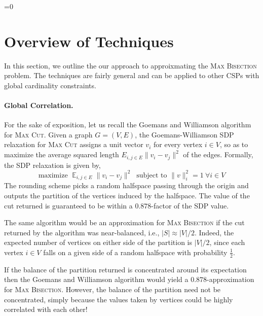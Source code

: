 \documentclass[11pt]{article}
\def\full{1}
\theoremstyle{definition}
\newcommand{\norm}[1]{\lVert#1\rVert}
\newcommand{\Esymb}{\mathbb{E}}
\DeclareMathOperator*{\E}{\Esymb}
\newcommand{\problemmacro}[1]{\texorpdfstring{\textsc{#1}}{#1}\xspace}
\newcommand{\maxcut}{\problemmacro{Max Cut}}
\newcommand{\maxbisection}{\problemmacro{Max Bisection}}
\numberwithin{equation}{section}
\let\origparagraph\paragraph
\renewcommand{\paragraph}[1]{\origparagraph{#1.}}
\begin{document}
\ifnum\full=0 \vspace{-8pt}\fi

\section{Overview of Techniques} \label{sec:overview}

In this section, we outline the our approach to approixmating the
\maxbisection problem.  The techniques are fairly general and can be applied to other CSPs with global cardinality constraints.


\paragraph{Global Correlation}
For the sake of exposition, let us recall the Goemans and Williamson algorithm
for \maxcut.
Given a graph $G = (V,E)$, the Goemans-Williamson SDP relaxation for
\maxcut assigns a unit vector $v_i$ for every vertex $i \in V$, so as to maximize the average squared length $E_{i,j \in E} \norm{v_i - v_j}^2$ of the edges.  Formally, the SDP relaxation is given by,
$$ \textrm{maximize }    \E_{i,j \in E} \norm{v_i - v_j}^2  \ \textrm{ subject to } \norm{v}_i^2 = 1 ~\forall i \in V$$
The rounding scheme picks a random halfspace passing through the
origin and outputs the partition of the vertices induced by the
halfspace.  The value of the cut returned is guaranteed to be within a
$0.878$-factor of the SDP value.

The same algorithm would be an approximation for \maxbisection if the
cut returned by the algorithm was near-balanced, i.e., $|S| \approx
|V|/2$.  Indeed, the expected number of vertices on either side of the
partition is $|V|/2$, since each vertex $i \in V$ falls on a given
side of a random halfspace with probability $\frac{1}{2}$.

If the balance of the partition returned is concentrated around its
expectation then the Goemans and Williamson algorithm would yield a
$0.878$-approximation for \maxbisection.   However, the balance of the
partition need not be concentrated, simply because the values taken by
vertices could be highly correlated with each other!
\end{document}
